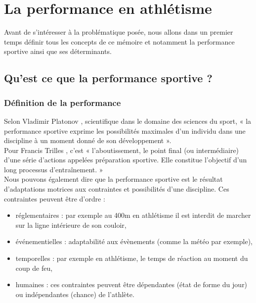  \chapter{La performance en athlétisme}
\label{part:performance}


Avant de s'intéresser à la problématique posée, nous  allons dans un premier temps définir tous les concepts de ce mémoire et notamment la performance sportive ainsi que ses déterminants.\\

    \section {Qu'est ce que la performance sportive ?}
    
        \subsection{Définition de la performance}
        
            Selon Vladimir Platonov \cite{platonov88}, scientifique dans le domaine des sciences du sport, « la performance sportive exprime les possibilités maximales d'un individu dans une discipline à un moment donné de son développement ». \\
            
            Pour Francis Trilles \cite{trilles02}, c'est « l'aboutissement, le point final (ou intermédiaire) d'une série d'actions appelées préparation sportive. Elle constitue l'objectif d'un long processus d'entraînement. »\\
        
            Nous pouvons également dire que la performance sportive est le résultat d’adaptations motrices aux contraintes et possibilités d'une discipline. 
            Ces contraintes peuvent être d'ordre :
            \begin{itemize}
                \item réglementaires : par exemple au 400m en athlétisme il est interdit de marcher sur la ligne intérieure de son couloir,
                \item événementielles : adaptabilité aux évènements (comme la météo par exemple),
                \item temporelles : par exemple en athlétisme, le temps de réaction au moment du coup de feu,
                \item humaines : ces contraintes peuvent être dépendantes (état de forme du jour) ou indépendantes (chance) de l'athlète.\\
            \end{itemize}
        
